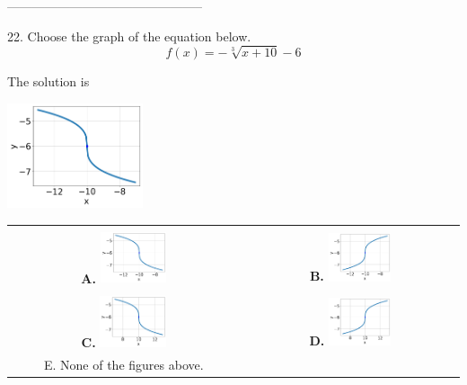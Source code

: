 \documentclass{extbook}[14pt]
\begin{document}
-----------------------------------------------

22. Choose the graph of the equation below.
\[ f(x) = - \sqrt[3]{x + 10} - 6 \] 

 
 The solution is  
 \begin{center} \includegraphics[width=0.3\textwidth]{../Figures/radicalEquationToGraphBC.png} \end{center}\begin{tabular}{|c|c|} 
\hline 
 & \tabularnewline 
 \textbf{A.} \includegraphics[width=0.3\textwidth]{../Figures/radicalEquationToGraphBC.png} & \textbf{B.} \includegraphics[width=0.3\textwidth]{../Figures/radicalEquationToGraphAC.png} \tabularnewline 
\hline 
 & \tabularnewline 
 \textbf{C.} \includegraphics[width=0.3\textwidth]{../Figures/radicalEquationToGraphDC.png} & \textbf{D.} \includegraphics[width=0.3\textwidth]{../Figures/radicalEquationToGraphCC.png} \tabularnewline 
\hline 
 E. None of the figures above. & \tabularnewline 
\hline 
 \end{tabular} 
 
\end{document}
